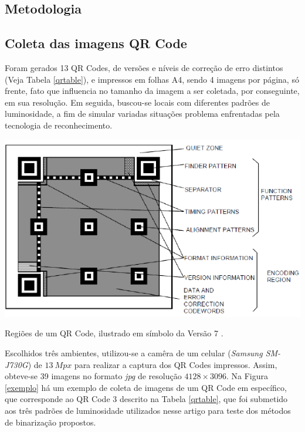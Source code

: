 \documentclass{ceel}
\begin{document}
\begin{multicols}{2}
\section{Metodologia} \label{metodologia}

\subsection{Coleta das imagens QR Code}

Foram gerados 13 QR Codes, de versões e níveis de correção de erro distintos (Veja Tabela \ref{qrtable}), e impressos em folhas A4, sendo 4 imagens por página, só frente, fato que influencia no tamanho da imagem a ser coletada, por conseguinte, em sua resolução. Em seguida, buscou-se locais com diferentes padrões de luminosidade, a fim de simular variadas 
situações problema enfrentadas pela tecnologia de reconhecimento.

\hspace{-0.45cm}
\begin{minipage}[h]{\columnwidth}
\captionsetup{type=figure, margin=5pt}
\includegraphics[width=\columnwidth]{regioes-qr-upercase}
\caption{\label{regioes}Regiões de um QR Code, ilustrado em símbolo da Versão 7 \cite{chines}.} 
\end{minipage}
\vspace{0.25cm}

Escolhidos três ambientes, utilizou-se a camêra de um celular (\emph{Samsung SM-J730G}) de $13\ Mpx$ para realizar a captura dos QR Codes impressos. Assim, obteve-se 39 imagens no formato \emph{jpg} de resolução  $4128 \times 3096$. 
Na Figura \ref{exemplo} há um exemplo de coleta de imagens de um QR Code em específico, que corresponde ao QR Code 3 descrito na Tabela \ref{qrtable}, que foi submetido aos três padrões de luminosidade utilizados nesse artigo para teste dos métodos de binarização propostos.


\end{multicols}
\end{document}

